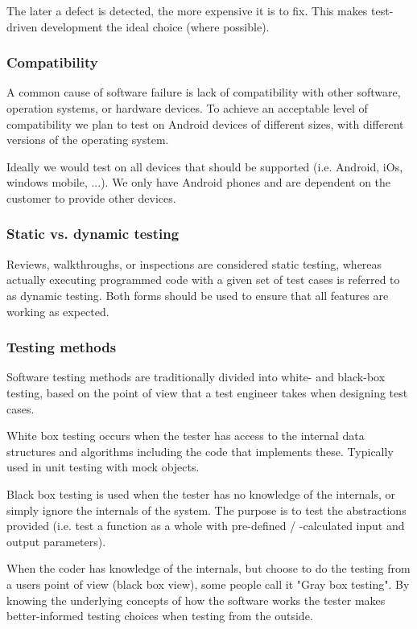 The later a defect is detected, the more expensive it is to fix. 
This makes test-driven development the ideal choice (where possible).

\subsubsection{Compatibility}

A common cause of software failure is lack of compatibility with other software,
operation systems, or hardware devices. To achieve an acceptable level of
compatibility we plan to test on Android devices of different sizes, with
different versions of the operating system. 

Ideally we would test on all devices that should be supported (i.e. Android,
iOs, windows mobile, ...). We only have Android phones and are dependent on the
customer to provide other devices.

\subsubsection{Static vs. dynamic testing}

Reviews, walkthroughs, or inspections are considered static testing, whereas
actually executing programmed code with a given set of test cases is referred to
as dynamic testing. Both forms should be used to ensure that all features are
working as expected.

\subsubsection{Testing methods}

Software testing methods are traditionally divided into white- and black-box
testing, based on the point of view that a test engineer takes when designing
test cases.

White box testing occurs when the tester has access to the internal data
structures and algorithms including the code that implements these. Typically
used in unit testing with mock objects.

Black box testing is used when the tester has no knowledge of the internals, or
simply ignore the internals of the system. The purpose is to test the
abstractions provided (i.e. test a function as a whole with
pre-defined / -calculated input and output parameters).

When the coder has knowledge of the internals, but choose to do the testing from
a users point of view (black box view), some people call it "Gray box testing".
By knowing the underlying concepts of how the software works the tester makes
better-informed testing choices when testing from the outside.

